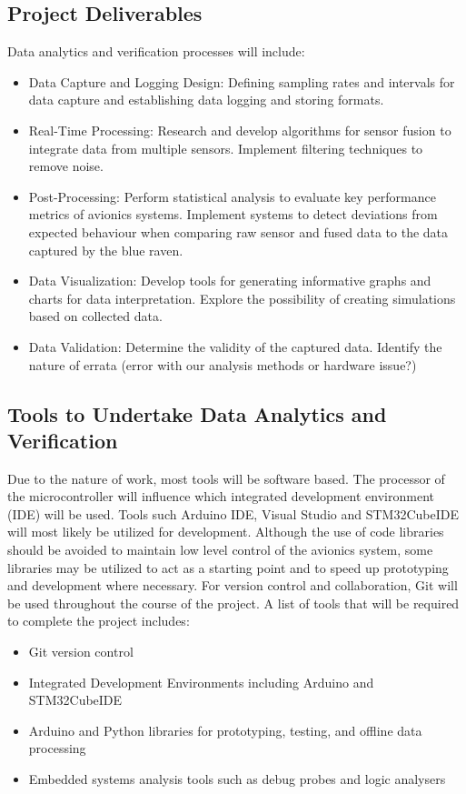 \subsection{Project Deliverables}
Data analytics and verification processes will include:  
\begin{itemize}
  \item Data Capture and Logging Design: Defining sampling rates and intervals for data capture and establishing data logging and storing formats. 
  \item Real-Time Processing: Research and develop algorithms for sensor fusion to integrate data from multiple sensors. Implement filtering techniques to remove noise. 
  \item Post-Processing: Perform statistical analysis to evaluate key performance metrics of avionics systems. Implement systems to detect deviations from expected behaviour when comparing raw sensor and fused data to the data captured by the blue raven.     
  \item Data Visualization: Develop tools for generating informative graphs and charts for data interpretation. Explore the possibility of creating simulations based on collected data. 
  \item Data Validation: Determine the validity of the captured data. Identify the nature of errata (error with our analysis methods or hardware issue?) 
\end{itemize}


\subsection{Tools to Undertake Data Analytics and Verification}
Due to the nature of work, most tools will be software based. The processor of the microcontroller will influence which integrated development environment (IDE) will be used. Tools such Arduino IDE, Visual Studio and STM32CubeIDE will most likely be utilized for development. Although the use of code libraries should be avoided to maintain low level control of the avionics system, some libraries may be utilized to act as a starting point and to speed up prototyping and development where necessary. For version control and collaboration, Git will be used throughout the course of the project. A list of tools that will be required to complete the project includes:

\begin{itemize}
  \item Git version control
  \item Integrated Development Environments including Arduino and STM32CubeIDE
  \item Arduino and Python libraries for prototyping, testing, and offline data processing 
  \item Embedded systems analysis tools such as debug probes and logic analysers
\end{itemize}

